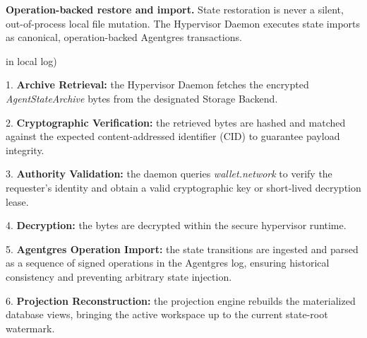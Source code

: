 \documentclass[
  11pt,
]{article}
\begin{document}
\textbf{Operation-backed restore and import.} State restoration is never
a silent, out-of-process local file mutation. The Hypervisor Daemon
executes state imports as canonical, operation-backed Agentgres
transactions.


\begin{center}
\end{center}

in local log)

1. \textbf{Archive Retrieval:} the Hypervisor Daemon fetches the
encrypted \emph{AgentStateArchive} bytes from the designated Storage
Backend.

2. \textbf{Cryptographic Verification:} the retrieved bytes are hashed
and matched against the expected content-addressed identifier (CID) to
guarantee payload integrity.

3. \textbf{Authority Validation:} the daemon queries
\emph{wallet.network} to verify the requester's identity and obtain a
valid cryptographic key or short-lived decryption lease.

4. \textbf{Decryption:} the bytes are decrypted within the secure
hypervisor runtime.

5. \textbf{Agentgres Operation Import:} the state transitions are
ingested and parsed as a sequence of signed operations in the Agentgres
log, ensuring historical consistency and preventing arbitrary state
injection.

6. \textbf{Projection Reconstruction:} the projection engine rebuilds
the materialized database views, bringing the active workspace up to the
current state-root watermark.
\end{document}
